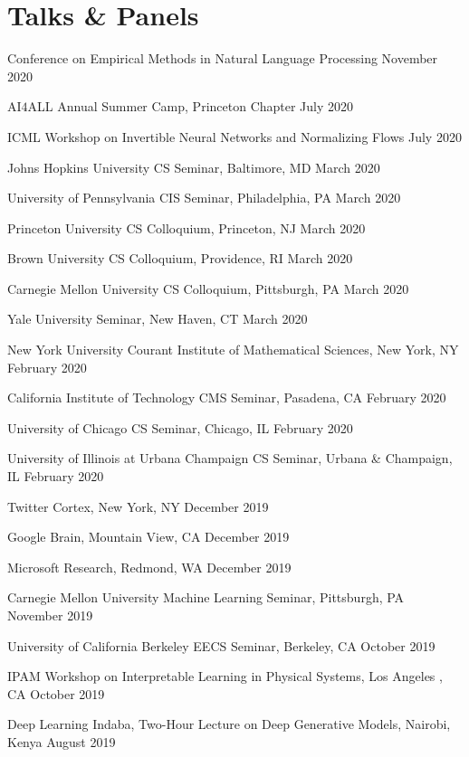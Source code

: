 \documentclass[letterpaper,200pt]{article}
\renewenvironment{itemize}{
  \begin{list}{}{
    \setlength{\leftmargin}{1.5em}
  }
}{
  \end{list}
}
\begin{document}
\section*{Talks \& Panels}
\begin{itemize}	 
	\item Conference on Empirical Methods in Natural Language Processing \hfill November 2020
	\item AI$4$ALL Annual Summer Camp, Princeton Chapter \hfill July 2020
	\item ICML Workshop on Invertible Neural Networks and Normalizing Flows \hfill July 2020
	\item Johns Hopkins University CS Seminar, Baltimore, MD  \hfill March 2020
	\item University of Pennsylvania CIS Seminar, Philadelphia, PA  \hfill March 2020
	\item Princeton University CS Colloquium, Princeton, NJ \hfill March 2020
	\item Brown University CS Colloquium, Providence, RI \hfill March 2020
	\item Carnegie Mellon University CS Colloquium, Pittsburgh, PA  \hfill March 2020
	\item Yale University Seminar, New Haven, CT \hfill March 2020
	\item New York University Courant Institute of Mathematical Sciences, New York, NY  \hfill February 2020 
	\item California Institute of Technology CMS Seminar, Pasadena, CA \hfill February 2020
	\item University of Chicago CS Seminar, Chicago, IL \hfill February 2020
	\item University of Illinois at Urbana Champaign CS Seminar, Urbana \& Champaign, IL \hfill February 2020
	\item Twitter Cortex, New York, NY \hfill December 2019
	\item Google Brain, Mountain View, CA \hfill December 2019
	\item Microsoft Research, Redmond, WA \hfill December 2019
	\item Carnegie Mellon University Machine Learning Seminar, Pittsburgh, PA \hfill November 2019
	\item University of California Berkeley EECS Seminar, Berkeley, CA  \hfill October 2019
	\item IPAM Workshop on Interpretable Learning in Physical Systems, Los Angeles , CA \hfill October 2019
	\item Deep Learning Indaba, Two-Hour Lecture on Deep Generative Models, Nairobi, Kenya \hfill August 2019

\end{itemize}
\end{document}

